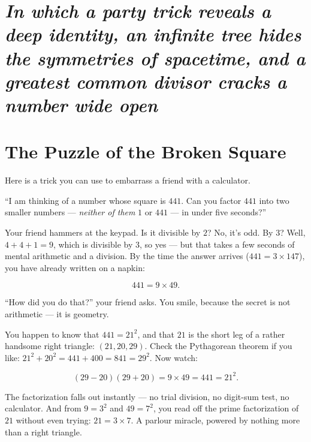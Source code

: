 \section{\texorpdfstring{\emph{In which a party trick reveals a deep identity, an infinite tree hides the symmetries of spacetime, and a greatest common divisor cracks a number wide open}}{In which a party trick reveals a deep identity, an infinite tree hides the symmetries of spacetime, and a greatest common divisor cracks a number wide open}}\label{ch3-in-which-a-party-trick-reveals-a-deep-identity-an-infinite-tree-hides-the-symmetries-of-spacetime-and-a-greatest-common-divisor-cracks-a-number-wide-open}



\section{The Puzzle of the Broken Square}\label{ch3-the-puzzle-of-the-broken-square}

Here is a trick you can use to embarrass a friend with a calculator.

``I am thinking of a number whose square is \(441\). Can you factor \(441\) into two smaller numbers --- \emph{neither of them} \(1\) or \(441\) --- in under five seconds?''

Your friend hammers at the keypad. Is it divisible by \(2\)? No, it's odd. By \(3\)? Well, \(4 + 4 + 1 = 9\), which is divisible by \(3\), so yes --- but that takes a few seconds of mental arithmetic and a division. By the time the answer arrives (\(441 = 3 \times 147\)), you have already written on a napkin:

\[441 = 9 \times 49.\]

``How did you do that?'' your friend asks. You smile, because the secret is not arithmetic --- it is geometry.

You happen to know that \(441 = 21^2\), and that \(21\) is the short leg of a rather handsome right triangle: \((21, 20, 29)\). Check the Pythagorean theorem if you like: \(21^2 + 20^2 = 441 + 400 = 841 = 29^2\). Now watch:

\[(29 - 20)(29 + 20) = 9 \times 49 = 441 = 21^2.\]

The factorization falls out instantly --- no trial division, no digit-sum test, no calculator. And from \(9 = 3^2\) and \(49 = 7^2\), you read off the prime factorization of \(21\) without even trying: \(21 = 3 \times 7\). A parlour miracle, powered by nothing more than a right triangle.


